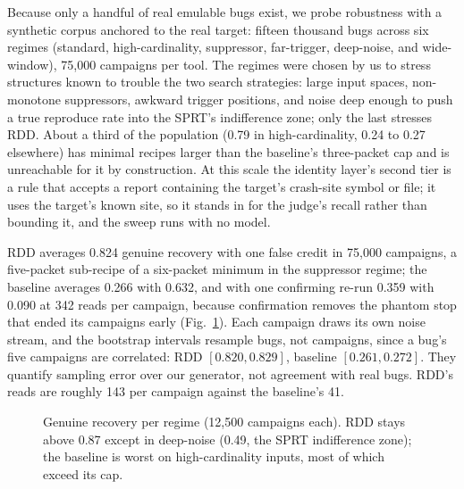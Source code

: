 Because only a handful of real emulable bugs exist, we probe robustness with a
synthetic corpus anchored to the real target: fifteen thousand bugs across six
regimes (standard, high-cardinality, suppressor, far-trigger, deep-noise, and
wide-window), 75,000 campaigns per tool. The regimes were chosen by us to stress
structures known to trouble the two search strategies: large input spaces,
non-monotone suppressors, awkward trigger positions, and noise deep enough to push
a true reproduce rate into the SPRT's indifference zone; only the last stresses
RDD. About a third of the population (0.79 in high-cardinality, 0.24 to 0.27
elsewhere) has minimal recipes larger than the baseline's three-packet cap and is
unreachable for it by construction. At this scale the identity layer's second tier
is a rule that accepts a report containing the target's crash-site symbol or
file; it uses the target's known site, so it stands in for the judge's recall
rather than bounding it, and the sweep runs with no model.

RDD averages 0.824 genuine recovery with one false credit in 75,000 campaigns, a
five-packet sub-recipe of a six-packet minimum in the suppressor regime; the baseline averages
0.266 with 0.632, and with one confirming re-run 0.359 with 0.090 at 342 reads
per campaign, because confirmation removes the phantom stop that ended its
campaigns early (Fig.~\ref{fig:regimes}). %
Each campaign draws its own noise stream, and the bootstrap intervals resample bugs,
not campaigns, since a bug's five campaigns are correlated: RDD $[0.820, 0.829]$, baseline $[0.261, 0.272]$. They quantify
sampling error over our generator, not agreement with real bugs. RDD's reads are
roughly 143 per campaign against the baseline's 41.

\begin{figure}[!t]
\centering
{}
\caption{Genuine recovery per regime (12,500 campaigns each). RDD stays above 0.87
except in deep-noise (0.49, the SPRT indifference zone); the baseline is worst on
high-cardinality inputs, most of which exceed its cap.}%
\label{fig:regimes}
\end{figure}

